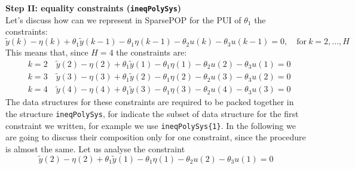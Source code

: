 \noindent
\textbf{Step II: equality constraints (\texttt{ineqPolySys})}\\ 
Let's discuss how can we represent in SparsePOP for the PUI of $\theta_1$ the constraints:
\begin{equation*}
    \tilde{y}(k)-\eta(k) + \theta_1 \tilde{y}(k-1)- \theta_1 \eta(k-1)  - \theta_2 u(k) - \theta_3 u(k-1)=0, \quad \text{for} \ k=2,...,H
\end{equation*}
This means that, since $H=4$ the constraints are:
\begin{align*}
    &k=2 \quad \tilde{y}(2)-\eta(2) + \theta_1 \tilde{y}(1) - \theta_1 \eta(1) -\theta_2 u(2) - \theta_3 u(1)=0\\
    &k=3 \quad \tilde{y}(3)-\eta(3) + \theta_1 \tilde{y}(2) - \theta_1 \eta(2) -\theta_2 u(3) - \theta_3 u(2)=0\\
    &k=4 \quad \tilde{y}(4)-\eta(4) + \theta_1 \tilde{y}(3) - \theta_1 \eta(3) -\theta_2 u(4) - \theta_3 u(3)=0
\end{align*}
The data structures for these constraints are required to be packed together in the structure \texttt{ineqPolySys}, for indicate the subset of data structure for the first constraint we written, for example we use \texttt{ineqPolySys\{1\}}. In the following we are going to discuss their composition only for one constraint, since the procedure is almost the same. Let us analyse the constraint
\begin{equation*}
    \tilde{y}(2)-\eta(2) + \theta_1 \tilde{y}(1) - \theta_1 \eta(1) -\theta_2 u(2) - \theta_3 u(1)=0
\end{equation*}

